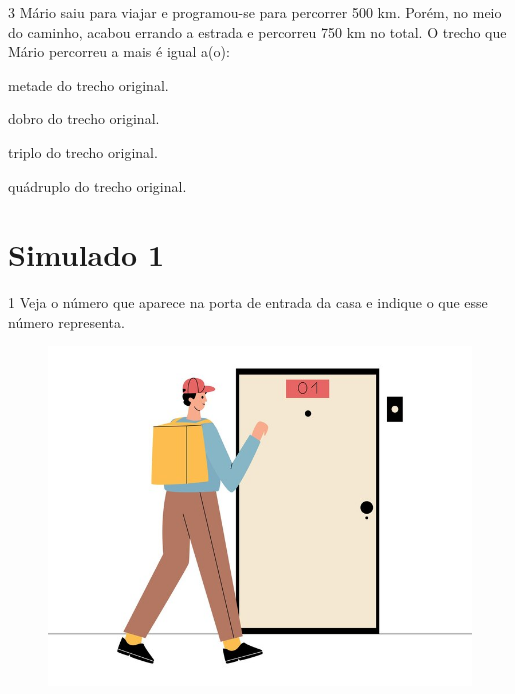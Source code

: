 \num{3} Mário saiu para viajar e programou-se para percorrer 500 km. Porém, no
meio do caminho, acabou errando a estrada e percorreu 750 km no total. O
trecho que Mário percorreu a mais é igual a(o):

\begin{escolha}
\item metade do trecho original.

\item dobro do trecho original.

\item triplo do trecho original.

\item quádruplo do trecho original.
\end{escolha}


\chapter{Simulado 1}

\num{1} Veja o número que aparece na porta de entrada da casa e indique o que
esse número representa.

\begin{figure}[htpb!]
\includegraphics[width=\textwidth]{./media/image105old.png}
\end{figure}

